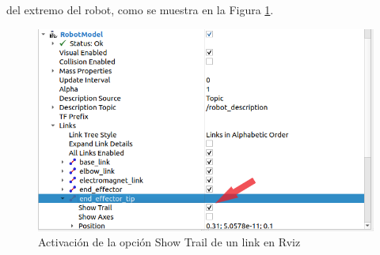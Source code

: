 del extremo del robot, como se muestra en la Figura \ref{fig:activarTrail}.
\begin{figure} [ht!]
    \begin{center}
        \includegraphics[width=12cm]{figs/rviz_show_trail.png}
    \end{center}
    \caption{Activación de la opción Show Trail de un link en Rviz}
\label{fig:activarTrail}
\end{figure}



